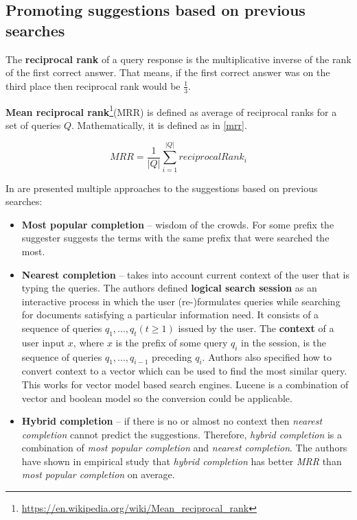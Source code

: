 \subsection{Promoting suggestions based on previous searches}
The \textbf{reciprocal rank} of a query response is the multiplicative inverse of the rank of the first correct answer.
That means, if the first correct answer was on the third place then reciprocal rank would be $\frac{1}{3}$.

\textbf{Mean reciprocal rank}\footnote{\url{https://en.wikipedia.org/wiki/Mean\_reciprocal\_rank}}(MRR) is defined as
average of reciprocal ranks for a set of queries $Q$. Mathematically, it is defined as in \ref{mrr}.

\begin{equation}
\label{mrr}
MRR = \frac{1}{\vert Q \vert} \sum_{i=1}^{\vert Q \vert} reciprocalRank_i
\end{equation}

In \citep{Bar-yossef11context-sensitivequery} are presented multiple approaches to the suggestions based on previous
searches:
\begin{itemize}
    \item \textbf{Most popular completion} – wisdom of the crowds. For some prefix the suggester suggests the terms
    with the same prefix that were searched the most.
    \item \textbf{Nearest completion} – takes into account current context of the user that is typing the queries.
    The authors defined \textbf{logical search session} as an interactive process in which the user (re-)formulates queries
    while searching for documents satisfying a particular information need. It consists of a sequence of
    queries $q_1, . . . , q_t (t \geq 1)$ issued by the user. The \textbf{context} of a user input $x$, where $x$ is the prefix of
    some query $q_i$ in the session, is the sequence of queries $q_1, . . . , q_{i-1}$ preceding $q_i$.
    Authors also specified how to convert context to a vector which can be used to find the most similar query.
    This works for vector model based search engines. Lucene is a combination of vector and boolean model so the
    conversion could be applicable.

    \item \textbf{Hybrid completion} – if there is no or almost no context then \textit{nearest completion} cannot predict the
    suggestions. Therefore, \textit{hybrid completion} is a combination of \textit{most popular completion} and \textit{nearest completion}.
    The authors have shown in empirical study that \textit{hybrid completion} has better \textit{MRR} than
    \textit{most popular completion} on average.
\end{itemize}


